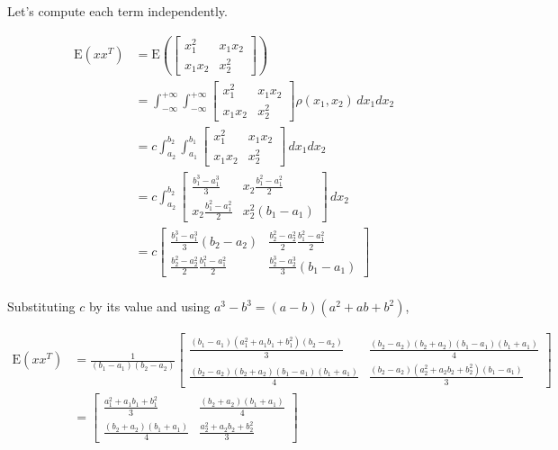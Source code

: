 \documentclass[a4paper, 10pt, twoside]{article}
\begin{document}
\begin{enumerate}[a)]
          Let's compute each term independently.

          \begin{align*}
              \mathrm{E}(xx^T)
               & = \mathrm{E}(\begin{bmatrix} x_1^2 & x_1x_2 \\ x_1x_2 & x_2^2 \end{bmatrix})                                                               \\
               & = \int_{-\infty}^{+\infty}\int_{-\infty}^{+\infty} \begin{bmatrix} x_1^2 & x_1x_2 \\ x_1x_2 & x_2^2 \end{bmatrix}\rho(x_1, x_2) \,dx_1dx_2 \\
               & = c\int_{a_2}^{b_2}\int_{a_1}^{b_1} \begin{bmatrix} x_1^2 & x_1x_2 \\ x_1x_2 & x_2^2 \end{bmatrix}\,dx_1dx_2                               \\
               & = c\int_{a_2}^{b_2} \begin{bmatrix} \frac{b_1^3 - a_1^3}{3} & x_2\frac{b_1^2-a_1^2}{2} \\ x_2\frac{b_1^2-a_1^2}{2} & x_2^2(b_1-a_1) \end{bmatrix}\,dx_2                                                   \\
               & =  c \begin{bmatrix} \frac{b_1^3 - a_1^3}{3}(b_2-a_2) & \frac{b_2^2-a_2^2}{2}\frac{b_1^2-a_1^2}{2} \\ \frac{b_2^2-a_2^2}{2}\frac{b_1^2-a_1^2}{2} & \frac{b_2^3 - a_2^3}{3}(b_1-a_1) \end{bmatrix}                                                                        \\
          \end{align*}

          Substituting $c$ by its value and using $a^3 - b^3 = (a-b)(a^2 + ab + b^2)$,

          \begin{align*}
              \mathrm{E}(xx^T)
               & = \frac{1}{(b_1-a_1)(b_2-a_2)}\begin{bmatrix} \frac{(b_1-a_1)(a_1^2+a_1b_1+b_1^2)(b_2-a_2)}{3} & \frac{(b_2-a_2)(b_2+a_2)(b_1-a_1)(b_1+a_1)}{4} \\ \frac{(b_2-a_2)(b_2+a_2)(b_1-a_1)(b_1+a_1)}{4} & \frac{(b_2-a_2)(a_2^2+a_2b_2+b_2^2)(b_1-a_1)}{3} \end{bmatrix} \\
               & = \begin{bmatrix} \frac{a_1^2+a_1b_1+b_1^2}{3} & \frac{(b_2+a_2)(b_1+a_1)}{4} \\ \frac{(b_2+a_2)(b_1+a_1)}{4} & \frac{a_2^2+a_2b_2+b_2^2}{3} \end{bmatrix}                             \\
          \end{align*}


\end{enumerate}
\end{document}
